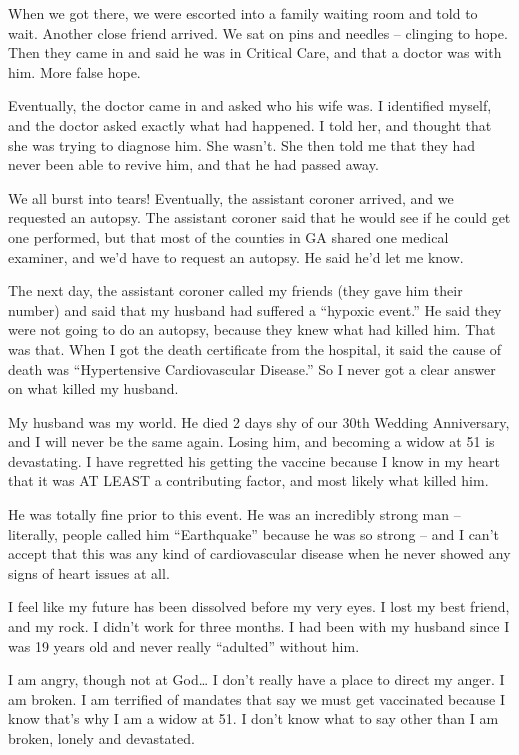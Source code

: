 When we got there, we were escorted into a family waiting room and told to
wait. Another close friend arrived. We sat on pins and needles – clinging to
hope. Then they came in and said he was in Critical Care, and that a doctor was
with him. More false hope.

Eventually, the doctor came in and asked who his wife was. I identified myself,
and the doctor asked exactly what had happened. I told her, and thought that she
was trying to diagnose him. She wasn’t. She then told me that they had never
been able to revive him, and that he had passed away.

We all burst into tears! Eventually, the assistant coroner arrived, and we
requested an autopsy. The assistant coroner said that he would see if he could
get one performed, but that most of the counties in GA shared one medical
examiner, and we’d have to request an autopsy. He said he’d let me know.

The next day, the assistant coroner called my friends (they gave him their
number) and said that my husband had suffered a “hypoxic event.” He said they
were not going to do an autopsy, because they knew what had killed him. That was
that. When I got the death certificate from the hospital, it said the cause of
death was “Hypertensive Cardiovascular Disease.” So I never got a clear answer
on what killed my husband.

My husband was my world. He died 2 days shy of our 30th Wedding Anniversary, and
I will never be the same again. Losing him, and becoming a widow at 51 is
devastating. I have regretted his getting the vaccine because I know in my heart
that it was AT LEAST a contributing factor, and most likely what killed him.

He was totally fine prior to this event. He was an incredibly strong man –
literally, people called him “Earthquake” because he was so strong – and I can’t
accept that this was any kind of cardiovascular disease when he never showed any
signs of heart issues at all.

I feel like my future has been dissolved before my very eyes. I lost my best
friend, and my rock. I didn’t work for three months. I had been with my husband
since I was 19 years old and never really “adulted” without him.

I am angry, though not at God… I don’t really have a place to direct my anger. I
am broken. I am terrified of mandates that say we must get vaccinated because I
know that’s why I am a widow at 51. I don’t know what to say other than I am
broken, lonely and devastated.


